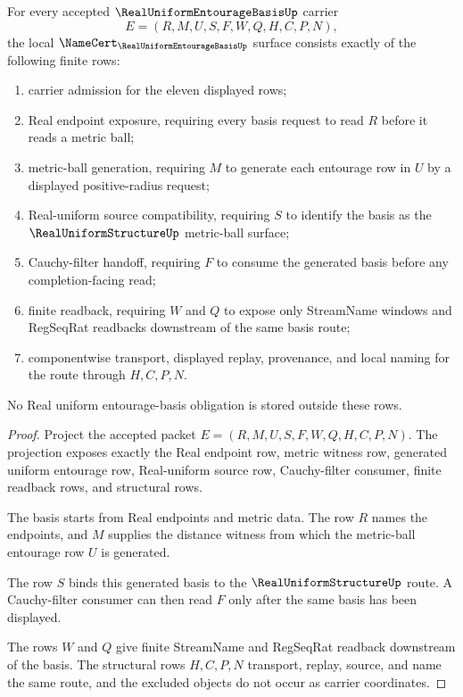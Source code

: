 \begin{theorem}
\label{thm:real-uniform-entourage-basis-namecert-obligations}
For every accepted $\RealUniformEntourageBasisUp$ carrier
$$
E=(R,M,U,S,F,W,Q,H,C,P,N),
$$
the local $\NameCert_{\RealUniformEntourageBasisUp}$ surface consists exactly of the following finite rows:
\begin{enumerate}
\item carrier admission for the eleven displayed rows;
\item Real endpoint exposure, requiring every basis request to read $R$ before it reads a metric ball;
\item metric-ball generation, requiring $M$ to generate each entourage row in $U$ by a displayed positive-radius request;
\item Real-uniform source compatibility, requiring $S$ to identify the basis as the $\RealUniformStructureUp$ metric-ball surface;
\item Cauchy-filter handoff, requiring $F$ to consume the generated basis before any completion-facing read;
\item finite readback, requiring $W$ and $Q$ to expose only StreamName windows and RegSeqRat readbacks downstream of the same basis route;
\item componentwise transport, displayed replay, provenance, and local naming for the route through $H,C,P,N$.
\end{enumerate}
No Real uniform entourage-basis obligation is stored outside these rows.
\end{theorem}
\begin{proof}
Project the accepted packet $E=(R,M,U,S,F,W,Q,H,C,P,N)$. The projection exposes exactly the Real endpoint row, metric witness row, generated uniform entourage row, Real-uniform source row, Cauchy-filter consumer, finite readback rows, and structural rows.

The basis starts from Real endpoints and metric data. The row $R$ names the endpoints, and $M$ supplies the distance witness from which the metric-ball entourage row $U$ is generated.

The row $S$ binds this generated basis to the $\RealUniformStructureUp$ route. A Cauchy-filter consumer can then read $F$ only after the same basis has been displayed.

The rows $W$ and $Q$ give finite StreamName and RegSeqRat readback downstream of the basis. The structural rows $H,C,P,N$ transport, replay, source, and name the same route, and the excluded objects do not occur as carrier coordinates.
\end{proof}


